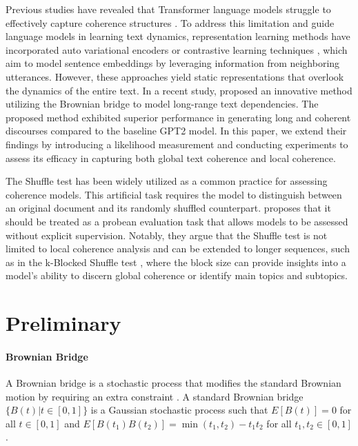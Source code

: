 \documentclass[letterpaper]{article}
\begin{document}
Previous studies have revealed that Transformer language models struggle to effectively capture coherence structures \citep{deng2022model}. To address this limitation and guide language models in learning text dynamics, representation learning methods have incorporated auto variational encoders \citep{bowman2016generating} or contrastive learning techniques \citep{gao2022simcse}, which aim to model sentence embeddings by leveraging information from neighboring utterances. However, these approaches yield static representations that overlook the dynamics of the entire text. In a recent study, \citet{wang2023language} proposed an innovative method utilizing the Brownian bridge to model long-range text dependencies. The proposed method exhibited superior performance in generating long and coherent discourses compared to the baseline GPT2 model. In this paper, we extend their findings by introducing a likelihood measurement and conducting experiments to assess its efficacy in capturing both global text coherence and local coherence.

The Shuffle test \citep{barzilay-lapata-2008-modeling} has been widely utilized as a common practice for assessing coherence models. This artificial task requires the model to distinguish between an original document and its randomly shuffled counterpart. \citet{laban-etal-2021-transformer} proposes that it should be treated as a probean evaluation task that allows models to be assessed without explicit supervision. Notably, they argue that the Shuffle test is not limited to local coherence analysis and can be extended to longer sequences, such as in the k-Blocked Shuffle test \citep{van1985semantic,hearst-1997-text}, where the block size can provide insights into a model's ability to discern global coherence or identify main topics and subtopics.


\section{Preliminary} \label{methods}
\paragraph{Brownian Bridge}
A Brownian bridge is a stochastic process that modifies the standard Brownian motion by requiring an extra constraint \citep{chow2009brownian,revuz2013continuous}. A standard Brownian bridge $\{B(t)|t\in [0,1]\}$ is a Gaussian stochastic process such that $E[B(t)] = 0$ for all $t\in[0,1]$ and $E[B(t_1)B(t_2)]=\min(t_1,t_2)-t_1t_2$ for all $t_1,t_2\in [0,1]$.
\end{document}
